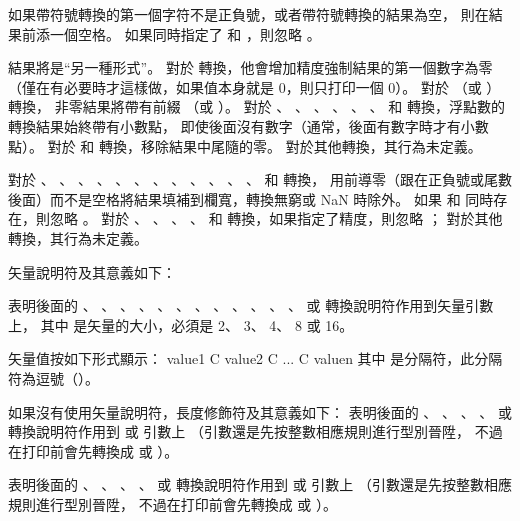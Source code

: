{{
如果帶符號轉換的第一個字符不是正負號，或者帶符號轉換的結果為空，
則在結果前添一個空格。
如果同時指定了  和 \ccmm{+}，則忽略 。
\stopclSpecifier

\startbuffer
\cemp{#}
\stopbuffer
\startclSpecifier{\getbuffer}
結果將是“另一種形式”。
對於  轉換，他會增加精度強制結果的第一個數字為零
（僅在有必要時才這樣做，如果值本身就是 0，則只打印一個 0）。
對於  （或 ）轉換，
非零結果將帶有前綴  （或 ）。
對於 、 、 、 、 、
 、  和  轉換，浮點數的轉換結果始終帶有小數點，
即使後面沒有數字（通常，後面有數字時才有小數點）。
對於  和  轉換，{}移除結果中尾隨的零。
對於其他轉換，其行為未定義。
\stopclSpecifier

對於 、 、 、 、 、
 、 、 、 、 、
 、 、  和  轉換，
用前導零（跟在正負號或尾數後面）而不是空格將結果填補到欄寬，轉換無窮或 NaN 時除外。
如果  和 \cemp{-} 同時存在，則忽略 。
對於 、 、 、 、  和
  轉換，如果指定了精度，則忽略 ；
對於其他轉換，其行為未定義。
\stopclSpecifier

矢量說明符及其意義如下：

表明後面的 、 、 、 、
 、 、 、 、
 、 、 、 、
  或  轉換說明符作用到矢量引數上，
其中  是矢量的大小，必須是 2、 3、 4、 8 或 16。

矢量值按如下形式顯示：
\startclc[indentnext=no]
value1 C value2 C ... C valuen
\stopclc
其中  是分隔符，此分隔符為逗號（\ccmm{,}）。
\stopclSpecifier

如果沒有使用矢量說明符，長度修飾符及其意義如下：
表明後面的 、 、 、 、
  或  轉換說明符作用到  或  引數上
（引數還是先按整數相應規則進行型別晉陞，
不過在打印前會先轉換成  或 ）。
\stopclSpecifier

表明後面的 、 、 、 、
  或  轉換說明符作用到  或  引數上
（引數還是先按整數相應規則進行型別晉陞，
不過在打印前會先轉換成  或 ）。
\stopclSpecifier

}}

